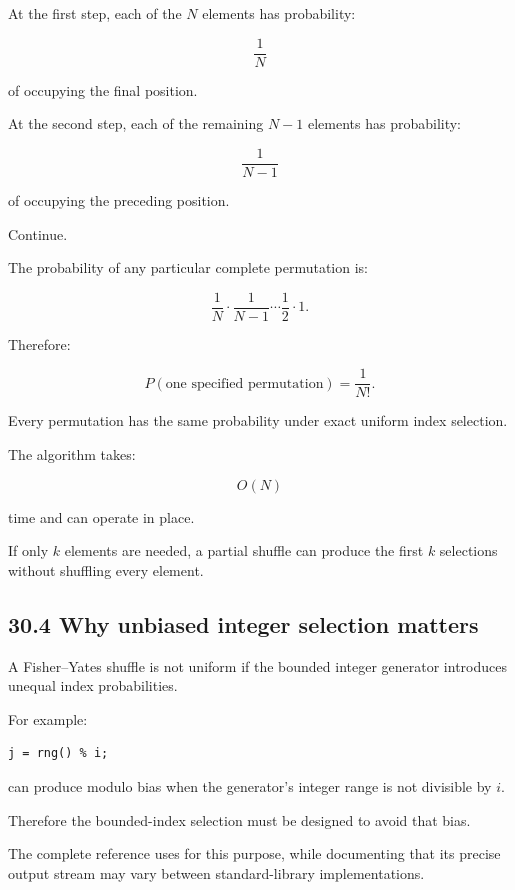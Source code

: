 \hypertarget{02-foundations-ii-ch031-proving-uniformity}{}

At the first step, each of the \(N\) elements has probability:

\[ \frac1N \]

of occupying the final position.

At the second step, each of the remaining \(N-1\) elements has probability:

\[ \frac1{N-1} \]

of occupying the preceding position.

Continue.

The probability of any particular complete permutation is:

\[ \frac1N \cdot \frac1{N-1} \cdots \frac12 \cdot1. \]

Therefore:

\[ \boxed{ P(\text{one specified permutation})=\frac1{N!} }. \]

Every permutation has the same probability under exact uniform index selection.

The algorithm takes:

\[ \boxed{O(N)} \]

time and can operate in place.

If only \(k\) elements are needed, a partial shuffle can produce the first \(k\) selections without shuffling every element.

\subsection{30.4 Why unbiased integer selection matters}\label{02-foundations-ii-ch031-why-unbiased-integer-selection-matters}

\hypertarget{02-foundations-ii-ch031-why-unbiased-integer-selection-matters}{}

A Fisher--Yates shuffle is not uniform if the bounded integer generator introduces unequal index probabilities.

For example:

\begin{verbatim}
j = rng() % i;
\end{verbatim}

can produce modulo bias when the generator's integer range is not divisible by \(i\).

Therefore the bounded-index selection must be designed to avoid that bias.

The complete reference uses  for this purpose, while documenting that its precise output stream may vary between standard-library implementations.

